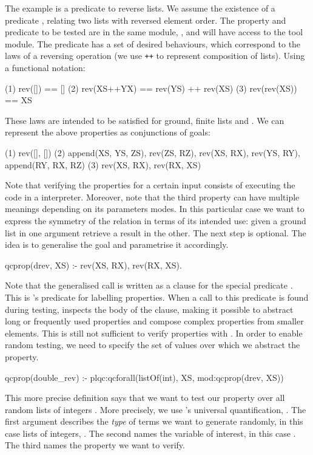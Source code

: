 The example is a predicate to reverse lists.
%
We assume the existence of a predicate , relating two lists
with reversed element order.
%
The property and predicate to be tested are in the same module,
, and will have access to the \plqc{} tool module.
%
The  predicate has a set of desired behaviours, which
correspond to the laws of a reversing operation (we use \texttt{++} to
represent composition of lists).
%
Using a functional notation:
{
\begin{code}
(1)        rev([])     == []
(2)     rev(XS++YX)    == rev(YS) ++ rev(XS)
(3)      rev(rev(XS))  == XS
\end{code}
}
These laws are intended to be satisfied for ground, finite lists
 and .
%
We can represent the above properties as conjunctions of \Prolog{}
goals:
%
\begin{yapcode}
  (1)  rev([], [])
  (2)  append(XS, YS, ZS), rev(ZS, RZ),
        rev(XS, RX), rev(YS, RY),
         append(RY, RX, RZ)
  (3)  rev(XS, RX), rev(RX, XS)
\end{yapcode}
%
Note that verifying the properties for a certain input consists of
executing the code in a \Prolog{} interpreter.
%
Moreover, note that the third property can have multiple meanings
depending on its parameters modes.
%
In this particular case we want to express the symmetry of the
 relation in terms of its intended use: given a ground
list in one argument retrieve a result in the other.
%
The next step is optional.
%
The idea is to generalise the goal and parametrise it accordingly.
%
\begin{yapcode}
 qcprop({drev, XS}) :-
   rev(XS, RX), rev(RX, XS).
\end{yapcode}
%
Note that the generalised call is  written as a clause for the special
predicate . %
%
This is \plqc{}'s predicate for labelling properties.
%
When a call to this predicate is found during testing, \plqc{} inspects
the body of the clause, making it possible to abstract long or
frequently used properties and compose complex properties from smaller
elements.
%
This is still not sufficient to verify properties with \plqc{}.
%
In order to enable random testing, we
need to specify the set of values over which we abstract the property.
%
\begin{yapcode}
 qcprop(double_rev) :-
   plqc:qcforall(listOf(int), XS,
                 mod:qcprop({drev, XS}))
\end{yapcode}
%
This more precise definition says that we want to test our 
property over all random lists of integers .
%
More precisely, we use \plqc{}'s universal quantification,
.
%
The first argument describes the \emph{type} of terms we want to
generate randomly, in this case lists of integers,
.
%
The second names the variable of interest, in this case .
%
The third names the property we want to verify.


